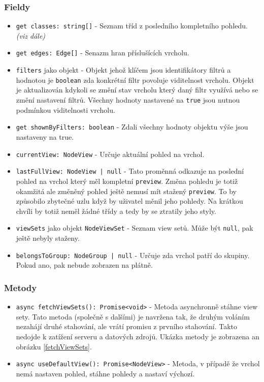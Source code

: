 \subsubsection*{Fieldy}
\begin{itemize}
  \item \texttt{get classes: string[]} - Seznam tříd z posledního kompletního pohledu. \textit{(viz dále)}
  \item \texttt{get edges: Edge[]} - Senazm hran příslušících vrcholu.
  \item \texttt{filters} jako objekt - Objekt jehož klíčem jsou identifikátory filtrů a hodnotou je \texttt{boolean} zda konkrétní filtr povoluje viditelnost vrcholu. Objekt je aktualizován kdykoli se změní stav vrcholu který daný filtr využívá nebo se změní nastavení filtrů. Všechny hodnoty nastavené na \texttt{true} jsou nutnou podmínkou viditelnosti vrcholu.
  \item \texttt{get shownByFilters: boolean} - Zdali všechny hodnoty objektu výše jsou nastaveny na true.
  \item \texttt{currentView: NodeView} - Určuje aktuální pohled na vrchol.
  \item \texttt{lastFullView: NodeView | null} - Tato proměnná odkazuje na poslední pohled na vrchol který měl kompletní \texttt{preview}. Změna pohledu je totiž okamžitá ale změněný pohled ještě nemusí mít stažený \texttt{preview}. To by způsobilo zbytečné  uzlu když by uživatel měnil jeho pohledy. Na krátkou chvíli by totiž neměl žádné třídy a tedy by se ztratily jeho styly.
  \item \texttt{viewSets} jako objekt \texttt{NodeViewSet} - Seznam view setů. Může být \texttt{null}, pak ještě nebyly staženy.
  \item \texttt{belongsToGroup: NodeGroup | null} - Určuje zda vrchol patří do skupiny. Pokud ano, pak nebude zobrazen na plátně.
\end{itemize}


\subsubsection*{Metody}
\begin{itemize}
  \item \texttt{async fetchViewSets(): Promise<void>} - Metoda asynchronně stáhne view sety. Tato metoda (společně s dalšími) je navržena tak, že druhým voláním nezahájí druhé stahování, ale vrátí promisu z prvního stahování. Takto nedojde k zatížení serveru a datových zdrojů. Ukázka metody je zobrazena an obrázku \ref{fetchViewSets}.
  \item \texttt{async useDefaultView(): Promise<NodeView>} - Metoda, v případě že vrchol nemá nastaven pohled, stáhne pohledy a nastaví výchozí.
\end{itemize}

